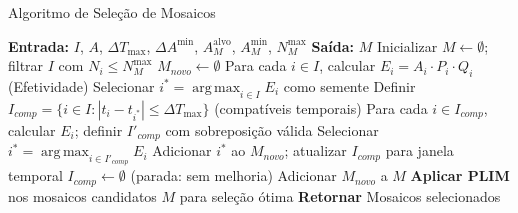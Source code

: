 \documentclass[aspectratio=169,11pt]{beamer}
\DeclareMathOperator*{\argmax}{arg\,max}
\begin{document}
\begin{frame}{Algoritmo de Seleção de Mosaicos}
\vspace{-0.3cm}

\begin{algorithm}[H]
\tiny
\caption{Seleção de mosaicos candidatos}
\begin{algorithmic}[1]
\State%
\textbf{Entrada:} $I$, $A$, $\Delta T_{\max}$, $\Delta A^{\min}$, $A_M^{\text{alvo}}$, $A_M^{\min}$, $N_M^{\max}$
\State%
\textbf{Saída:} $M$
\State%
Inicializar $M \gets \emptyset$; filtrar $I$ com $N_i \leq N_M^{\max}$
    \State%
    $M_{novo} \gets \emptyset$
    \State%
    Para cada $i \in I$, calcular $E_i = A_i \cdot P_i \cdot Q_i$ (Efetividade)
    \State%
    Selecionar $i^* = \argmax_{i \in I} E_i$ como semente
    \State%
    Definir $I_{comp} = \{i \in I : |t_i - t_{i^*}| \leq \Delta T_{\max}\}$ (compatíveis temporais)
        \State%
        Para cada $i \in I_{comp}$, calcular $E_i$; definir $I'_{comp}$ com sobreposição válida
        \State%
        Selecionar $i^* = \argmax_{i \in I'_{comp}} E_i$
            \State%
            Adicionar $i^*$ ao $M_{novo}$; atualizar $I_{comp}$ para janela temporal
        \Else%
            \State%
            $I_{comp} \gets \emptyset$ (parada: sem melhoria)
        \EndIf%
    \EndWhile%
        \State%
        Adicionar $M_{novo}$ a $M$
    \EndIf%
\EndWhile%
\State%
\textbf{Aplicar PLIM} nos mosaicos candidatos $M$ para seleção ótima
\State%
\textbf{Retornar} Mosaicos selecionados
\end{algorithmic}
\end{algorithm}
\end{frame}
\end{document}
